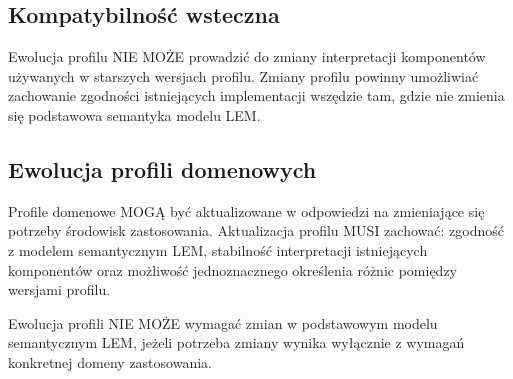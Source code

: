 \subsection{Kompatybilność wsteczna}
Ewolucja profilu NIE MOŻE prowadzić do zmiany interpretacji komponentów używanych w starszych wersjach profilu. Zmiany profilu powinny umożliwiać zachowanie zgodności istniejących implementacji wszędzie tam, gdzie nie zmienia się podstawowa semantyka modelu LEM.

\subsection{Ewolucja profili domenowych}
Profile domenowe MOGĄ być aktualizowane w odpowiedzi na zmieniające się potrzeby środowisk zastosowania. Aktualizacja profilu MUSI zachować: zgodność z modelem semantycznym LEM, stabilność interpretacji istniejących komponentów oraz możliwość jednoznacznego określenia różnic pomiędzy wersjami profilu.

Ewolucja profili NIE MOŻE wymagać zmian w podstawowym modelu semantycznym LEM, jeżeli potrzeba zmiany wynika wyłącznie z wymagań konkretnej domeny zastosowania.
